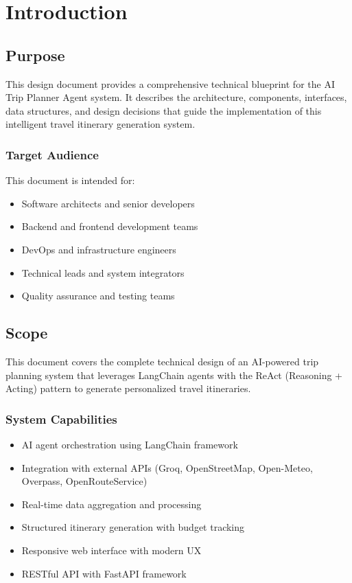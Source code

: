 \documentclass[12pt,a4paper]{report}
\begin{document}
\chapter{Introduction}

\section{Purpose}

This design document provides a comprehensive technical blueprint for the AI Trip Planner Agent system. It describes the architecture, components, interfaces, data structures, and design decisions that guide the implementation of this intelligent travel itinerary generation system.

\subsection{Target Audience}

This document is intended for:

\begin{itemize}[leftmargin=*]
    \item Software architects and senior developers
    \item Backend and frontend development teams
    \item DevOps and infrastructure engineers
    \item Technical leads and system integrators
    \item Quality assurance and testing teams
\end{itemize}

\section{Scope}

This document covers the complete technical design of an AI-powered trip planning system that leverages LangChain agents with the ReAct (Reasoning + Acting) pattern to generate personalized travel itineraries.

\subsection{System Capabilities}

\begin{itemize}[leftmargin=*]
    \item AI agent orchestration using LangChain framework
    \item Integration with external APIs (Groq, OpenStreetMap, Open-Meteo, Overpass, OpenRouteService)
    \item Real-time data aggregation and processing
    \item Structured itinerary generation with budget tracking
    \item Responsive web interface with modern UX
    \item RESTful API with FastAPI framework
\end{itemize}
\end{document}
